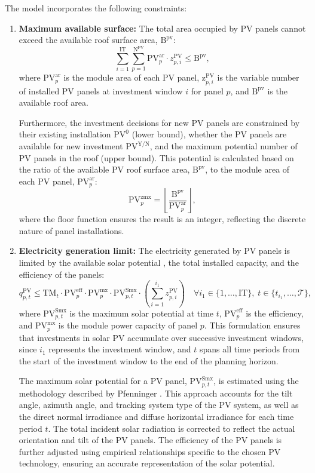 \documentclass[11pt]{article}
\begin{document}
The model incorporates the following constraints:
\begin{enumerate}
    \item \textbf{Maximum available surface:}
    The total area occupied by PV panels cannot exceed the available roof surface area, \(\text{B}^\text{pv}\):
    \[
    \sum_{i=1}^{\text{IT}} \sum_{p=1}^{\text{N}^\text{PV}} \text{PV}^\text{ar}_p \cdot z^\text{PV}_{p,i} \leq \text{B}^\text{pv},
    \]
    where \(\text{PV}^\text{ar}_p\) is the module area of each PV panel, \(\text{z}^\text{PV}_{p,i}\) is the variable number of installed PV panels at investment window \(i\) for panel \(p\), and \(\text{B}^\text{pv}\) is the available roof area.
    
    Furthermore, the investment decisions for new PV panels are constrained by their existing installation \(\text{PV}^\text{0}\) (lower bound), whether the PV panels are available for new investment \(\text{PV}^\text{Y/N}\), and the maximum potential number of PV panels in the roof (upper bound). This potential is calculated based on the ratio of the available PV roof surface area, \(\text{B}^\text{pv}\), to the module area of each PV panel, \(\text{PV}^\text{ar}_p\):
    \[
    \text{PV}^\text{zmx}_p = \left\lfloor \frac{\text{B}^\text{pv}}{\text{PV}^\text{ar}_p} \right\rfloor,
    \]
    where the floor function ensures the result is an integer, reflecting the discrete nature of panel installations.
    
    \item \textbf{Electricity generation limit:}
    The electricity generated by PV panels is limited by the available solar potential , the total installed capacity, and the efficiency of the panels:
    \[
    q^\text{PV}_{p,t} \leq \text{TM}_t \cdot \text{PV}^\text{eff}_p \cdot \text{PV}^\text{mx}_p \cdot \text{PV}^\text{Smx}_{p,t} \cdot \left(\sum_{i=1}^{i_1} z^\text{PV}_{p,i}\right)
    \quad
    \forall i_1 \in \{1, \dots, \text{IT}\}, \; t \in \{t_{i_1}, \dots, \mathcal{T}\},
    \]
    where \(\text{PV}^\text{Smx}_{p,t}\) is the maximum solar potential at time \(t\), \(\text{PV}^\text{eff}_p\) is the efficiency, and \(\text{PV}^\text{mx}_p\) is the module power capacity of panel \(p\). This formulation ensures that investments in solar PV accumulate over successive investment windows, since \(i_1\) represents the investment window, and \(t\) spans all time periods from the start of the investment window to the end of the planning horizon.

    The maximum solar potential for a PV panel, \(\text{PV}^\text{Smx}_{p,t}\), is estimated using the methodology described by Pfenninger \cite{pfenninger2016long}. This approach accounts for the tilt angle, azimuth angle, and tracking system type of the PV system, as well as the direct normal irradiance and diffuse horizontal irradiance for each time period \(t\). The total incident solar radiation is corrected to reflect the actual orientation and tilt of the PV panels. The efficiency of the PV panels is further adjusted using empirical relationships specific to the chosen PV technology, ensuring an accurate representation of the solar potential.
    
\end{enumerate}
\end{document}
